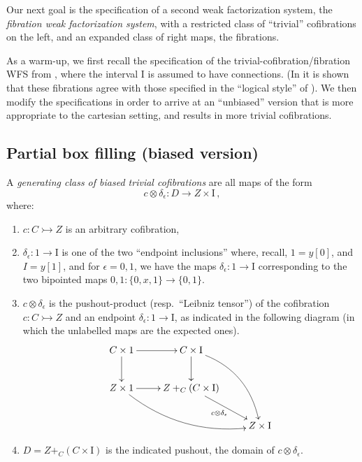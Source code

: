 \documentclass[12pt]{article}
\newcommand{\mono}{\ensuremath{\rightarrowtail}}
\newcommand{\ra}{\ensuremath{\rightarrow}}
\newcommand{\I}{\ensuremath{\mathrm{I}}}
\theoremstyle{remark}
\theoremstyle{definition}
\begin{document}
Our next goal is the specification of a second weak factorization system, the \emph{fibration weak factorization system}, with a restricted class of ``trivial'' cofibrations on the left, and an expanded class of right maps, the fibrations. 

As a warm-up, we first recall the specification of the trivial-cofibration/fibration WFS from \cite{GS}, where the interval $\I$ is assumed to have connections.  
(In \cite{AGH} it is shown that these fibrations agree with those specified in the ``logical style'' of \cite{CCHM,OP}).  We then modify the specifications in order to arrive at an ``unbiased'' version that is more appropriate to the cartesian setting, and results in more trivial cofibrations.

\subsection{Partial box filling (biased version)}\label{sec:biasedfibration}

A \emph{generating class of biased trivial cofibrations} are all maps of the form
\begin{equation}\label{eq:genclassTCof}
c \otimes \delta_\epsilon : D \ra Z\times \I\,,
\end{equation}
where:
\begin{enumerate}
\item  $c : C \mono Z$ is an arbitrary cofibration,

\item $\delta_\epsilon : 1 \ra \I$ is one of the two ``endpoint inclusions'' where, recall, $1 = y[0]$, and $I=y[1]$, and for $\epsilon = 0,1$, we have the maps $\delta_\epsilon : 1 \ra \I$ corresponding to the two bipointed maps $0,1 : \{0, x, 1\} \ra \{0,1\}$.

\item $c\otimes\delta_\epsilon$ is the pushout-product (resp.\ ``Leibniz tensor'') of the cofibration $c : C\mono Z$ and an endpoint $\delta_\epsilon:1 \ra \I$, as indicated in the following diagram (in which the unlabelled maps are the expected ones).
\begin{equation}\label{diagram:pushoutproduct}
\xymatrix{
C\times 1 \ar[d] \ar[r] & C\times \I \ar[d] \ar@/^4ex/ [rdd]\\
Z\times 1 \ar@/_4ex/ [rrd] \ar[r] &  Z +_C (C\times\I) \ar[rd]_{c \otimes \delta_\epsilon} \\
&& Z\times\I
}
\end{equation}

\item $D = Z +_C (C\times\I)$ is the indicated pushout, the domain of $c \otimes \delta_\epsilon$.
\end{enumerate}
\end{document}
